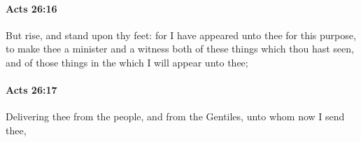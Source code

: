 		\paragraph{Acts 26:16} %
			\label{ACTS-26-16}

			But rise, and stand upon thy feet: for I have appeared unto thee for this purpose, to make thee a minister and a witness both of these things which thou hast seen, and of those things in the which I will appear unto thee;

			\begin{framed}
			\scriptsize
				\begin{compactdesc}
					\item[SBLG] 
				\end{compactdesc}
			\end{framed}

		\paragraph{Acts 26:17} %
			\label{ACTS-26-17}

			Delivering thee from the people, and from the Gentiles, unto whom now I send thee,

